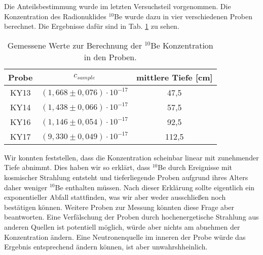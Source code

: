 Die Anteilsbestimmung wurde im letzten Versuchsteil vorgenommen.
Die Konzentration des Radionuklides $^{10}$Be wurde dazu in vier verschiedenen Proben berechnet.
Die Ergebnisse dafür sind in Tab. \ref{dis_con} zu sehen.
\begin{table}[h]
\centering
\caption{Gemessene Werte zur Berechnung der $^{10}$Be Konzentration in den Proben.}
\begin{tabular}{|c |c| c|}
\hline
Probe& $c_{sample}$ & mittlere Tiefe [cm] \\
\hline
KY13 &  $(1,668 \pm 0,076) \cdot 10^{-17}$ & 47,5\\
KY14 &  $(1,438 \pm 0,066) \cdot 10^{-17}$ & 57,5 \\
KY16 &  $(1,146 \pm 0,054) \cdot 10^{-17}$ & 92,5\\
KY17 &  $(9,330 \pm 0,049) \cdot 10^{-17}$ & 112,5\\
\hline
\end{tabular}
\label{dis_con}
\end{table}
Wir konnten feststellen, dass die Konzentration scheinbar linear mit zunehmender Tiefe abnimmt.
Dies haben wir so erklärt, dass $^{10}$Be durch Ereignisse mit kosmischer Strahlung entsteht und tieferliegende Proben aufgrund ihres Alters daher weniger $^{10}$Be enthalten müssen.
Nach dieser Erklärung sollte eigentlich ein exponentieller Abfall stattfinden, was wir aber weder ausschließen noch bestätigen können.
Weitere Proben zur Messung könnten diese Frage aber beantworten.
Eine Verfälschung der Proben durch hochenergetische Strahlung aus anderen Quellen ist potentiell möglich, würde aber nichts am abnehmen der Konzentration ändern.
Eine Neutronenquelle im inneren der Probe würde das Ergebnis entsprechend ändern können, ist aber unwahrshheinlich.
